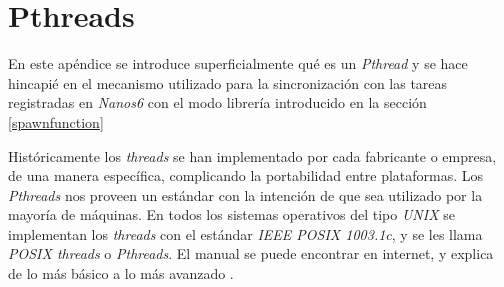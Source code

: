 

\section{Pthreads}
\label{appendix:pthread}

En este apéndice se introduce superficialmente qué es un \textit{Pthread} y se hace hincapié en el mecanismo utilizado para la sincronización con las tareas registradas en \textit{Nanos6} con el modo librería introducido en la sección \ref{spawnfunction} 
\bigskip

Históricamente los \textit{threads} se han implementado por cada fabricante o empresa, de una manera específica, complicando la portabilidad entre plataformas. Los \textit{Pthreads} nos proveen un estándar con la intención de que sea utilizado por la mayoría de máquinas. En todos los sistemas operativos del tipo \textit{UNIX} se implementan los \textit{threads} con el estándar \textit{IEEE POSIX 1003.1c}, y se les llama \textit{POSIX threads} o \textit{Pthreads}. El manual se puede encontrar en internet, y explica de lo más básico a lo más avanzado \cite{barney2009posix}. 
\bigskip











